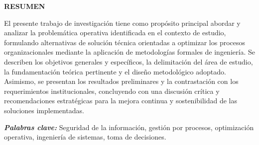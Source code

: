 \ifmostrarresumen
  \newpage
  \thispagestyle{estiloresponsables}

  \begin{center}
    {\fontsize{14pt}{18pt}\selectfont \textbf{RESUMEN}}
  \end{center}

  \vspace{0.8cm}

  El presente trabajo de investigación tiene como propósito principal abordar y analizar la problemática operativa identificada en el contexto de estudio, formulando alternativas de solución técnica orientadas a optimizar los procesos organizacionales mediante la aplicación de metodologías formales de ingeniería. Se describen los objetivos generales y específicos, la delimitación del área de estudio, la fundamentación teórica pertinente y el diseño metodológico adoptado. Asimismo, se presentan los resultados preliminares y la contrastación con los requerimientos institucionales, concluyendo con una discusión crítica y recomendaciones estratégicas para la mejora continua y sostenibilidad de las soluciones implementadas.

  \vspace{1cm}

  \noindent \textbf{\textit{Palabras clave:}} Seguridad de la información, gestión por procesos, optimización operativa, ingeniería de sistemas, toma de decisiones.

  \vfill
  \newpage
\fi
